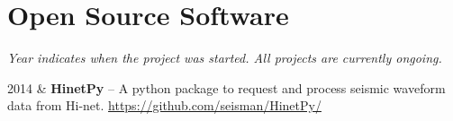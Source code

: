 \section{Open Source Software}

\emph{Year indicates when the project was started. All projects are currently ongoing.}

\begin{EntriesTable}{0.05}{0.02}{0.93}
2014 & \textbf{HinetPy} -- A python package to request and process seismic waveform data from Hi-net. \newline
       \url{https://github.com/seisman/HinetPy/} \\
\end{EntriesTable}
